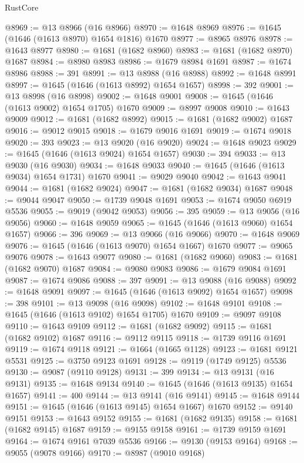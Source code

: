 \begin{lexlean}{RustCore}
\begin{coremodule}
@8969 := @13 @8966 (@16 @8966)
@8970 := @1648 @8969
@8976 := @1645 (@1646 (@1613 @8970) @1654 @1816) @1670
@8977 := @8965 @8976
@8978 := @1643 @8977
@8980 := @1681 (@1682 @8960)
@8983 := @1681 (@1682 @8970) @1687
@8984 := @8980 @8983
@8986 := @1679 @8984 @1691
@8987 := @1674 @8986
@8988 := 391
@8991 := @13 @8988 (@16 @8988)
@8992 := @1648 @8991
@8997 := @1645 (@1646 (@1613 @8992) @1654 @1657)
@8998 := 392
@9001 := @13 @8998 (@16 @8998)
@9002 := @1648 @9001
@9008 := @1645 (@1646 (@1613 @9002) @1654 @1705) @1670
@9009 := @8997 @9008
@9010 := @1643 @9009
@9012 := @1681 (@1682 @8992)
@9015 := @1681 (@1682 @9002) @1687
@9016 := @9012 @9015
@9018 := @1679 @9016 @1691
@9019 := @1674 @9018
@9020 := 393
@9023 := @13 @9020 (@16 @9020)
@9024 := @1648 @9023
@9029 := @1645 (@1646 (@1613 @9024) @1654 @1657)
@9030 := 394
@9033 := @13 @9030 (@16 @9030)
@9034 := @1648 @9033
@9040 := @1645 (@1646 (@1613 @9034) @1654 @1731) @1670
@9041 := @9029 @9040
@9042 := @1643 @9041
@9044 := @1681 (@1682 @9024)
@9047 := @1681 (@1682 @9034) @1687
@9048 := @9044 @9047
@9050 := @1739 @9048 @1691
@9053 := @1674 @9050 @6919 @5536
@9055 := @9019 (@9042 @9053)
@9056 := 395
@9059 := @13 @9056 (@16 @9056)
@9060 := @1648 @9059
@9065 := @1645 (@1646 (@1613 @9060) @1654 @1657)
@9066 := 396
@9069 := @13 @9066 (@16 @9066)
@9070 := @1648 @9069
@9076 := @1645 (@1646 (@1613 @9070) @1654 @1667) @1670
@9077 := @9065 @9076
@9078 := @1643 @9077
@9080 := @1681 (@1682 @9060)
@9083 := @1681 (@1682 @9070) @1687
@9084 := @9080 @9083
@9086 := @1679 @9084 @1691
@9087 := @1674 @9086
@9088 := 397
@9091 := @13 @9088 (@16 @9088)
@9092 := @1648 @9091
@9097 := @1645 (@1646 (@1613 @9092) @1654 @1657)
@9098 := 398
@9101 := @13 @9098 (@16 @9098)
@9102 := @1648 @9101
@9108 := @1645 (@1646 (@1613 @9102) @1654 @1705) @1670
@9109 := @9097 @9108
@9110 := @1643 @9109
@9112 := @1681 (@1682 @9092)
@9115 := @1681 (@1682 @9102) @1687
@9116 := @9112 @9115
@9118 := @1739 @9116 @1691
@9119 := @1674 @9118
@9121 := @1664 (@1665 @1128)
@9123 := @1681 @9121 @5531
@9125 := @3750 @9123 @1691
@9128 := @9119 (@1749 @9125) @5536
@9130 := @9087 (@9110 @9128)
@9131 := 399
@9134 := @13 @9131 (@16 @9131)
@9135 := @1648 @9134
@9140 := @1645 (@1646 (@1613 @9135) @1654 @1657)
@9141 := 400
@9144 := @13 @9141 (@16 @9141)
@9145 := @1648 @9144
@9151 := @1645 (@1646 (@1613 @9145) @1654 @1667) @1670
@9152 := @9140 @9151
@9153 := @1643 @9152
@9155 := @1681 (@1682 @9135)
@9158 := @1681 (@1682 @9145) @1687
@9159 := @9155 @9158
@9161 := @1739 @9159 @1691
@9164 := @1674 @9161 @7039 @5536
@9166 := @9130 (@9153 @9164)
@9168 := @9055 (@9078 @9166)
@9170 := @8987 (@9010 @9168)

\end{coremodule}
\end{lexlean}

